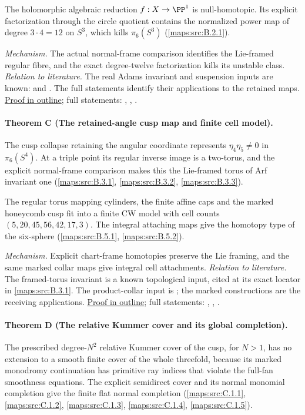 The holomorphic algebraic reduction $f:X\to\PP^1$ is
null-homotopic.  Its explicit factorization through the circle quotient
contains the normalized power map of degree $3\cdot4=12$ on $S^3$,
which kills $\pi_6(S^3)$ (\cref{maps:src:B.2.1}).

\textit{Mechanism.} The actual normal-frame comparison identifies the Lie-framed regular fibre, and the exact degree-twelve factorization kills its unstable class.
\textit{Relation to literature.} The real Adams invariant and suspension inputs are known: \cite[Theorem~4.14, p.~423]{mapsAPS2} and \cite[Theorem~4.1, Corollaries~4.2--4.3]{mapsToda52}. The full statements identify their applications to the retained maps.
\hyperlink{outline-III-B}{Proof in outline}; full statements: , , .

\hypertarget{main-III-C}{}
\paragraph{Theorem C (The retained-angle cusp map and finite cell model).}
\label{series:III:C}
The cusp collapse retaining the angular coordinate represents
$\eta_4\eta_5\ne0$ in $\pi_6(S^4)$.  At a triple point its
regular inverse image is a two-torus, and the explicit normal-frame
comparison makes this the Lie-framed torus of Arf invariant one
(\cref{maps:src:B.3.1}, \cref{maps:src:B.3.2}, \cref{maps:src:B.3.3}).

The regular torus mapping cylinders, the finite affine caps
and the marked honeycomb cusp fit into a finite CW model with cell
counts $(5,20,45,56,42,17,3)$.  The integral attaching maps give the
homotopy type of the six-sphere
(\cref{maps:src:B.5.1}, \cref{maps:src:B.5.2}).

\textit{Mechanism.} Explicit chart-frame homotopies preserve the Lie framing, and the same marked collar maps give integral cell attachments.
\textit{Relation to literature.} The framed-torus invariant is a known topological input, cited at its exact locator in \cref{maps:src:B.3.1}. The product-collar input is \cite[Theorem~6.1, p.~77]{mapsWaldhausen68}; the marked constructions are the receiving applications.
\hyperlink{outline-III-C}{Proof in outline}; full statements: , , .

\hypertarget{main-III-D}{}
\paragraph{Theorem D (The relative Kummer cover and its global completion).}
\label{series:III:D}
The prescribed degree-$N^2$ relative Kummer cover of the cusp,
for $N>1$, has no extension to a smooth finite cover of the whole
threefold, because its marked monodromy continuation has primitive
ray indices that violate the full-fan smoothness equations.
The explicit semidirect cover and its normal monomial completion
give the finite flat normal completion
(\cref{maps:src:C.1.1}, \cref{maps:src:C.1.2}, \cref{maps:src:C.1.3}, \cref{maps:src:C.1.4}, \cref{maps:src:C.1.5}).

